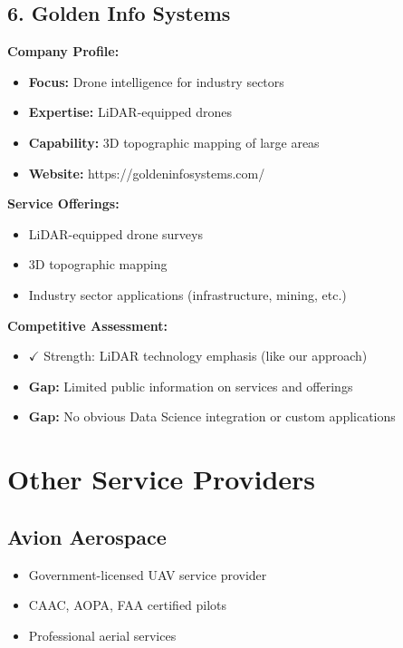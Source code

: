 \subsection{6. Golden Info Systems}

\textbf{Company Profile:}
\begin{itemize}
    \item \textbf{Focus:} Drone intelligence for industry sectors
    \item \textbf{Expertise:} LiDAR-equipped drones
    \item \textbf{Capability:} 3D topographic mapping of large areas
    \item \textbf{Website:} https://goldeninfosystems.com/
\end{itemize}

\textbf{Service Offerings:}
\begin{itemize}
    \item LiDAR-equipped drone surveys
    \item 3D topographic mapping
    \item Industry sector applications (infrastructure, mining, etc.)
\end{itemize}

\textbf{Competitive Assessment:}
\begin{itemize}
    \item \textcolor{AccentGreen}{$\checkmark$ Strength:} LiDAR technology emphasis (like our approach)
    \item \textbf{Gap:} Limited public information on services and offerings
    \item \textbf{Gap:} No obvious Data Science integration or custom applications
\end{itemize}

\section{Other Service Providers}

\subsection{Avion Aerospace}
\begin{itemize}
    \item Government-licensed UAV service provider
    \item CAAC, AOPA, FAA certified pilots
    \item Professional aerial services
\end{itemize}

